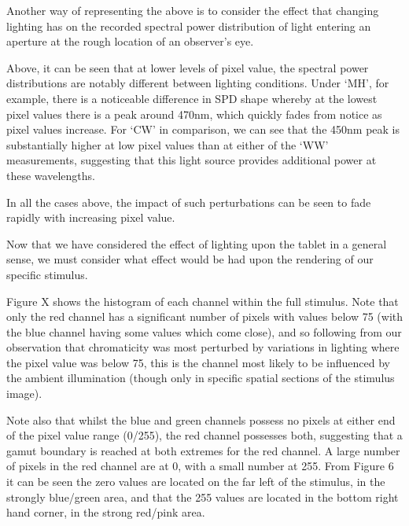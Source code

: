 
Another way of representing the above is to consider the effect that changing lighting has on the recorded spectral power distribution of light entering an aperture at the rough location of an observer's eye.


Above, it can be seen that at lower levels of pixel value, the spectral power distributions are notably different between lighting conditions. Under `MH', for example, there is a noticeable difference in \gls{SPD} shape whereby at the lowest pixel values there is a peak around 470nm, which quickly fades from notice as pixel values increase. For `CW' in comparison, we can see that the 450nm peak is substantially higher at low pixel values than at either of the `WW' measurements, suggesting that this light source provides additional power at these wavelengths.

In all the cases above, the impact of such perturbations can be seen to fade rapidly with increasing pixel value.

Now that we have considered the effect of lighting upon the tablet in a general sense, we must consider what effect would be had upon the rendering of our specific stimulus.


Figure X %
shows the histogram of each channel within the full stimulus. Note that only the red channel has a significant number of pixels with values below 75 (with the blue channel having some values which come close), and so following from our observation that chromaticity was most perturbed by variations in lighting where the pixel value was below 75, this is the channel most likely to be influenced by the ambient illumination (though only in specific spatial sections of the stimulus image).

Note also that whilst the blue and green channels possess no pixels at either end of the pixel value range (0/255), the red channel possesses both, suggesting that a gamut boundary is reached at both extremes for the red channel. A large number of pixels in the red channel are at 0, with a small number at 255. From Figure 6 it can be seen the zero values are located on the far left of the stimulus, in the strongly blue/green area, and that the 255 values are located in the bottom right hand corner, in the strong red/pink area.

